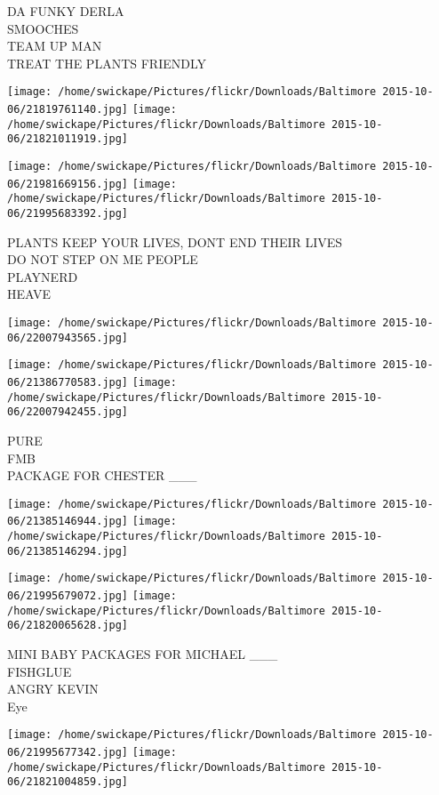 \documentclass[10pt,letterpaper]{article}
\begin{document}
DA FUNKY DERLA\\
SMOOCHES\\
TEAM UP MAN\\
TREAT THE PLANTS FRIENDLY
\pagebreak

\texttt{[image: /home/swickape/Pictures/flickr/Downloads/Baltimore 2015-10-06/21819761140.jpg]}
\texttt{[image: /home/swickape/Pictures/flickr/Downloads/Baltimore 2015-10-06/21821011919.jpg]}

\texttt{[image: /home/swickape/Pictures/flickr/Downloads/Baltimore 2015-10-06/21981669156.jpg]}
\texttt{[image: /home/swickape/Pictures/flickr/Downloads/Baltimore 2015-10-06/21995683392.jpg]}

PLANTS KEEP YOUR LIVES, DONT END THEIR LIVES\\
DO NOT STEP ON ME PEOPLE\\
PLAYNERD\\
HEAVE
\pagebreak

\texttt{[image: /home/swickape/Pictures/flickr/Downloads/Baltimore 2015-10-06/22007943565.jpg]}

\vspace{0.25in}
\texttt{[image: /home/swickape/Pictures/flickr/Downloads/Baltimore 2015-10-06/21386770583.jpg]}
\texttt{[image: /home/swickape/Pictures/flickr/Downloads/Baltimore 2015-10-06/22007942455.jpg]}

PURE\\
FMB\\
PACKAGE FOR CHESTER \_\_\_
\pagebreak

\texttt{[image: /home/swickape/Pictures/flickr/Downloads/Baltimore 2015-10-06/21385146944.jpg]}
\texttt{[image: /home/swickape/Pictures/flickr/Downloads/Baltimore 2015-10-06/21385146294.jpg]}

\texttt{[image: /home/swickape/Pictures/flickr/Downloads/Baltimore 2015-10-06/21995679072.jpg]}
\texttt{[image: /home/swickape/Pictures/flickr/Downloads/Baltimore 2015-10-06/21820065628.jpg]}

MINI BABY PACKAGES FOR MICHAEL \_\_\_\\
FISHGLUE\\
ANGRY KEVIN\\
Eye
\pagebreak

\texttt{[image: /home/swickape/Pictures/flickr/Downloads/Baltimore 2015-10-06/21995677342.jpg]}
\texttt{[image: /home/swickape/Pictures/flickr/Downloads/Baltimore 2015-10-06/21821004859.jpg]}
\end{document}
